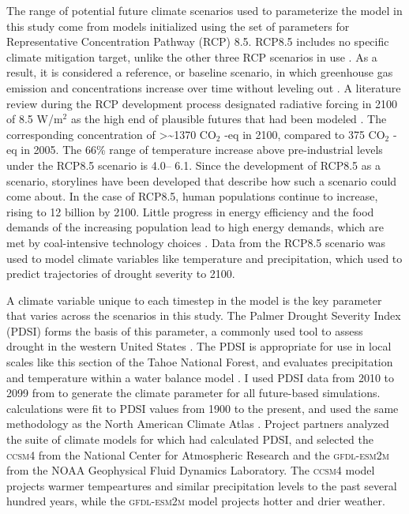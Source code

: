 The range of potential future climate scenarios used to parameterize the model in this study come from models initialized using the set of parameters for Representative Concentration Pathway (RCP) 8.5. RCP8.5 includes no specific climate mitigation target, unlike the other three RCP scenarios in use \citep{Riahi2011}. As a result, it is considered a reference, or baseline scenario, in which greenhouse gas emission and concentrations increase over time without leveling out \citep{Riahi2011}. A literature review during the RCP development process designated radiative forcing in 2100 of 8.5 W/m$^2$ as the high end of plausible futures that had been modeled \citep{VanVuuren2011}. The corresponding concentration of >\textasciitilde 1370 $\text{CO}_2$ -eq in 2100, compared to 375 $\text{CO}_2$ -eq in 2005. The 66\% range of temperature increase above pre-industrial levels under the RCP8.5 scenario is 4.0\textdegree -- 6.1\textdegree \citep{Rogelj2012}. Since the development of RCP8.5 as a scenario, storylines have been developed that describe how such a scenario could come about. In the case of RCP8.5, human populations continue to increase, rising to 12 billion by 2100. Little progress in energy efficiency and the food demands of the increasing population lead to high energy demands, which are met by coal-intensive technology choices \citep{Riahi2011}. Data from the RCP8.5 scenario was used to model climate variables like temperature and precipitation, which \citet{Cook2014} used to predict trajectories of drought severity to 2100.

A climate variable unique to each timestep in the model is the key parameter that varies across the scenarios in this study. The Palmer Drought Severity Index (PDSI) forms the basis of this parameter, a commonly used tool to assess drought in the western United States \citep{Cook2004}. The PDSI is appropriate for use in local scales like this section of the Tahoe National Forest, and evaluates precipitation and temperature within a water balance model \citep{HeimJr2002}. I used PDSI data from 2010 to 2099 from \citet{Cook2014} to generate the climate parameter for all future-based simulations. \citet{Cook2014} calculations were fit to PDSI values from 1900 to the present, and used the same methodology as the North American Climate Atlas \citep{Cook2004}. Project partners analyzed the suite of climate models for which \citet{Cook2014} had calculated PDSI, and selected the \textsc{ccsm4} from the National Center for Atmospheric Research and the \textsc{gfdl-esm2m} from the NOAA Geophysical Fluid Dynamics Laboratory. The \textsc{ccsm4} model projects warmer tempeartures and similar precipitation levels to the past several hundred years, while the \textsc{gfdl-esm2m} model projects hotter and drier weather.


